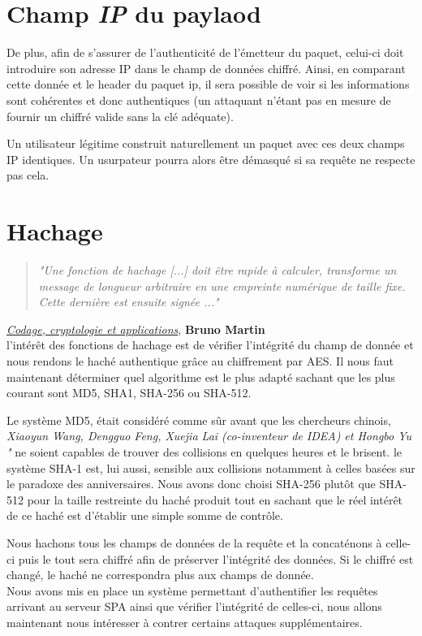 \section{Champ \textbf{\emph{IP}} du paylaod}

De plus, afin de s'assurer de l'authenticité de l'émetteur du paquet, celui-ci doit introduire son adresse IP dans le champ de données chiffré. Ainsi, en comparant cette donnée et le header du paquet ip, il sera possible de voir si les informations sont cohérentes et donc authentiques (un attaquant n'étant pas en mesure de fournir un chiffré valide sans la clé adéquate).

Un utilisateur légitime construit naturellement un paquet avec ces deux champs IP identiques. Un usurpateur pourra alors être démasqué si sa requête ne respecte pas cela.

\section{Hachage}
\begin{quotation}
\emph{"Une fonction de hachage [...] doit être rapide à calculer, transforme un message de longueur arbitraire en une empreinte numérique de taille fixe. Cette dernière est ensuite signée ..."}
\end{quotation}
\underline{\emph{Codage, cryptologie et applications}}, \textbf{Bruno Martin}\\

l'intérêt des fonctions de hachage est de vérifier l'intégrité du champ de donnée et nous rendons le haché authentique grâce au chiffrement par AES.
Il nous faut maintenant déterminer quel algorithme est le plus adapté sachant que les plus courant sont MD5, SHA1, SHA-256 ou SHA-512.\newline

Le système MD5, était considéré comme sûr avant que les chercheurs chinois, \emph{Xiaoyun Wang, Dengguo Feng, Xuejia Lai (co-inventeur de IDEA) et Hongbo Yu "} ne soient capables de trouver des collisions en quelques heures et le brisent.
le système SHA-1 est, lui aussi, sensible aux collisions notamment à celles basées sur le paradoxe des anniversaires.
Nous avons donc choisi SHA-256 plutôt que SHA-512 pour la taille restreinte du haché produit tout en sachant que le réel intérêt de ce haché est d'établir une simple somme de contrôle.\newline

Nous hachons tous les champs de données de la requête et la concaténons à celle-ci puis le tout sera chiffré afin de préserver l'intégrité des données. Si le chiffré est changé, le haché ne correspondra plus aux champs de donnée.\\

Nous avons mis en place un système permettant d'authentifier les requêtes arrivant au serveur SPA ainsi que vérifier l'intégrité de celles-ci, nous allons maintenant nous intéresser à contrer certains attaques supplémentaires.
 
 
